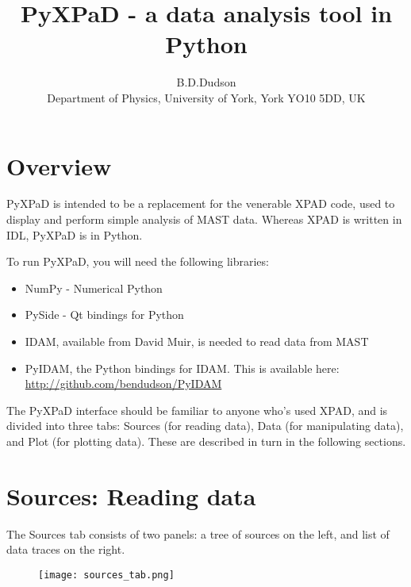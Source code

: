 \documentclass[12pt, a4paper]{article}
\begin{document}
\title{PyXPaD - a data analysis tool in Python}
\author{B.D.Dudson\dag\\
\dag Department of Physics, University of York, York YO10 5DD, UK}

\maketitle

\tableofcontents

\section{Overview}

PyXPaD is intended to be a replacement for the venerable XPAD code, used to display and perform simple analysis of MAST data. Whereas XPAD is written in IDL, PyXPaD is in Python. 

To run PyXPaD, you will need the following libraries:
\begin{itemize}
\item NumPy - Numerical Python
\item PySide - Qt bindings for Python
\item IDAM, available from David Muir, is needed to read data from MAST
\item PyIDAM, the Python bindings for IDAM. This is available here: \url{http://github.com/bendudson/PyIDAM}
\end{itemize}

The PyXPaD interface should be familiar to anyone who's used XPAD, and is divided into three tabs: Sources (for reading data), Data (for manipulating data), and Plot (for plotting data). These are described in turn in the following sections.

\section{Sources: Reading data}

The Sources tab consists of two panels: a tree of sources on the left, and list of
data traces on the right. 
\begin{figure}[hp!]
  \centering
  \texttt{[image: sources\_tab.png]}
  \caption{}
  \label{fig:sources_tab}
\end{figure}
\end{document}
